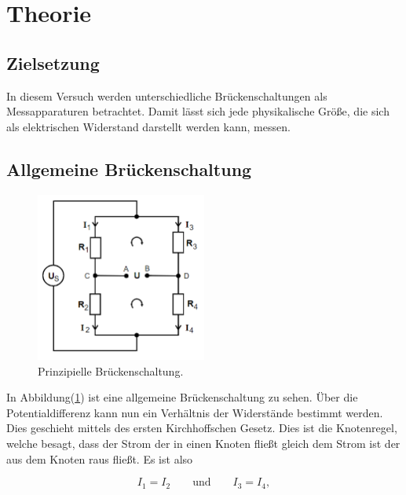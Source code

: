 \section{Theorie}

    \subsection{Zielsetzung}

        \noindent In diesem Versuch werden unterschiedliche Brückenschaltungen als Messapparaturen betrachtet. Damit lässt sich 
        jede physikalische Größe, die sich als elektrischen Widerstand darstellt werden kann, messen. 

    \subsection{Allgemeine Brückenschaltung}

        \begin{figure}[ht]
            \centering
            \includegraphics[width=0.5\textwidth]{latex/images/Prinzip_Brueck.PNG}
            \caption{Prinzipielle Brückenschaltung\protect \cite{V302}.}
            \label{img:Prinzip}
        \end{figure}

        \noindent In Abbildung(\ref{img:Prinzip}) ist eine allgemeine Brückenschaltung zu sehen. Über die Potentialdifferenz kann nun ein 
        Verhältnis der Widerstände bestimmt werden. Dies geschieht mittels des ersten Kirchhoffschen Gesetz. Dies ist die Knotenregel, welche besagt, 
        dass der Strom der in einen Knoten fließt gleich dem Strom ist der aus dem Knoten raus fließt. Es ist also 

        \begin{equation*}
            I_1 = I_2 \quad \quad \text{und} \quad \quad I_3 = I_4 ,
        \end{equation*}


